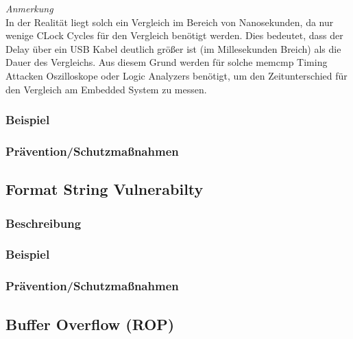 \documentclass[a4paper,
DIV=13,
12pt,
BCOR=10mm,
department=FakIM,
oneside,
parskip=half,
automark,
listof=totocnumbered,
bibliography=totocnumbered,
acronym=totocnumbered
] {OTHRartcl}
\begin{document}
\textit{Anmerkung} \mbox{} \\
In der Realität liegt solch ein Vergleich im Bereich von Nanosekunden, da nur wenige CLock Cycles für den Vergleich benötigt werden.
Dies bedeutet, dass der Delay über ein USB Kabel deutlich größer ist (im Millesekunden Breich) als die Dauer des Vergleichs.
Aus diesem Grund werden für solche memcmp Timing Attacken Oszilloskope oder Logic Analyzers benötigt, um den Zeitunterschied
für den Vergleich am Embedded System zu messen.




\subsubsection{Beispiel}

\subsubsection{Prävention/Schutzmaßnahmen}

\subsection{Format String Vulnerabilty}
\subsubsection{Beschreibung}
\subsubsection{Beispiel}
\subsubsection{Prävention/Schutzmaßnahmen}

\subsection{Buffer Overflow (ROP)}
\end{document}
